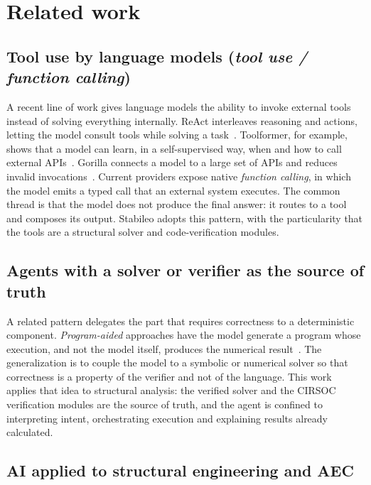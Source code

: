 \documentclass[11pt,a4paper]{article}
\begin{document}
\section{Related work}\label{sec:2}

\subsection{Tool use by language models (\emph{tool use / function calling})}\label{sec:2.1}

A recent line of work gives language models the ability to invoke external tools instead of solving everything internally. ReAct interleaves reasoning and actions, letting the model consult tools while solving a task~\cite{ref11}. Toolformer, for example, shows that a model can learn, in a self-supervised way, when and how to call external APIs~\cite{ref12}. Gorilla connects a model to a large set of APIs and reduces invalid invocations~\cite{ref13}. Current providers expose native \emph{function calling}, in which the model emits a typed call that an external system executes. The common thread is that the model does not produce the final answer: it routes to a tool and composes its output. Stabileo adopts this pattern, with the particularity that the tools are a structural solver and code-verification modules.

\subsection{Agents with a solver or verifier as the source of truth}\label{sec:2.2}

A related pattern delegates the part that requires correctness to a deterministic component. \emph{Program-aided} approaches have the model generate a program whose execution, and not the model itself, produces the numerical result~\cite{ref14}. The generalization is to couple the model to a symbolic or numerical solver so that correctness is a property of the verifier and not of the language. This work applies that idea to structural analysis: the verified solver and the CIRSOC verification modules are the source of truth, and the agent is confined to interpreting intent, orchestrating execution and explaining results already calculated.

\subsection{AI applied to structural engineering and AEC}\label{sec:2.3}
\end{document}
